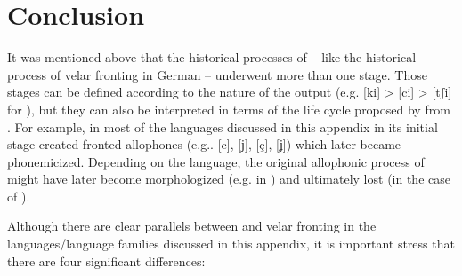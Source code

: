 \section{Conclusion}
It was mentioned above that the historical processes of  -- like the historical process of velar fronting in German -- underwent more than one stage. Those stages can be defined according to the nature of the output (e.g. [ki] > [ci] > [tʃi] for ), but they can also be interpreted in terms of the life cycle proposed by \citet{Hyman2013} from . For example, in most of the languages discussed in this appendix  in its initial stage created fronted allophones (e.g.. [c], [ɉ], [ç], [ʝ]) which later became phonemicized. Depending on the language, the original allophonic process of  might have later become morphologized (e.g. in ) and ultimately lost (in the case of ).

Although there are clear parallels between  and velar fronting in the languages/language families discussed in this appendix, it is important stress that there are four significant differences:

